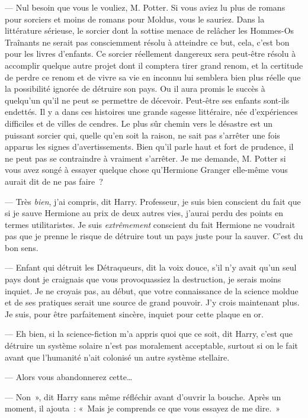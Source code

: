 --- Nul besoin que vous le vouliez, M. Potter.
Si vous aviez lu plus de romans pour sorciers et moins de romans pour Moldus, vous le sauriez.
Dans la littérature sérieuse, le sorcier dont la sottise menace de relâcher les Hommes-Os Traînants ne serait pas consciemment résolu à atteindre ce but, cela, c'est bon pour les livres d'enfants.
Ce sorcier réellement dangereux sera peut-être résolu à accomplir quelque autre projet dont il comptera tirer grand renom, et la certitude de perdre ce renom et de vivre sa vie en inconnu lui semblera bien plus réelle que la possibilité ignorée de détruire son pays.
Ou il aura promis le succès à quelqu'un qu'il ne peut se permettre de décevoir.
Peut-être ses enfants sont-ils endettés.
Il y a dans ces histoires une grande sagesse littéraire, née d'expériences difficiles et de villes de cendres.
Le plus sûr chemin vers le désastre est un puissant sorcier qui, quelle qu'en soit la raison, ne sait pas s'arrêter une fois apparus les signes d'avertissements.
Bien qu'il parle haut et fort de prudence, il ne peut pas se contraindre à vraiment s'arrêter.
Je me demande, M. Potter si vous avez songé à essayer quelque chose qu'Hermione Granger elle-même vous aurait dit de ne pas faire~?

--- Très \emph{bien}, j'ai compris, dit Harry.
Professeur, je suis bien conscient du fait que si je sauve Hermione au prix de deux autres vies, j'aurai perdu des points en termes utilitaristes.
Je suis \emph{extrêmement} conscient du fait Hermione ne voudrait pas que je prenne le risque de détruire tout un pays juste pour la sauver.
C'est du bon sens.

--- Enfant qui détruit les Détraqueurs, dit la voix douce, s'il n'y avait qu'un seul pays dont je craignais que vous provoquassiez la destruction, je serais moins inquiet.
Je ne croyais pas, au début, que votre connaissance de la science moldue et de ses pratiques serait une source de grand pouvoir.
J'y crois maintenant plus.
Je suis, pour être parfaitement sincère, inquiet pour cette plaque en or.

--- Eh bien, si la science-fiction m'a appris quoi que ce soit, dit Harry, c'est que détruire un système solaire n'est pas moralement acceptable, surtout si on le fait avant que l'humanité n'ait colonisé un autre système stellaire.

--- Alors vous abandonnerez cette…

--- Non~», dit Harry sans même réfléchir avant d'ouvrir la bouche.
Après un moment, il ajouta~: «~Mais je comprends ce que vous essayez de me dire.~»

